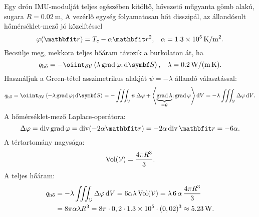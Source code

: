 \documentclass{szb-solution}
\begin{document}
Egy drón IMU-modulját teljes egészében kitöltő, hővezető műgyanta gömb alakú,
sugara $R = \SI{0.02}{\meter}$, A vezérlő egység folyamatosan hőt disszipál, az
állandósult hő\-mér\-sék\-let-mező jó közelítéssel
$$
  \varphi(\coordv) = T_c - \alpha \rvec r^2
  \text, \quad
  \alpha = \SI[per-mode=symbol]{1,3e5}{\kelvin\per\meter\squared}
  \text.
$$
Becsülje meg, mekkora teljes hőáram távozik a burkolaton át, ha
$$
  q_{\text{hő}}
  = -\oiint_{\partial \volimage} \scalar{\lambda \grad \varphi}{\dd \surfvec}
  \text,\quad
  \lambda = \SI[per-mode=symbol]{0,2}{\watt\per\meter\per\kelvin}
  \text.
$$
Használjuk a Green-tétel asszimetrikus alakját $\psi = -\lambda$ állandó
választással:
$$
  q_\text{hő}
  = \oiint_{\partial \volimage} \scalar{-\lambda \grad \varphi}{\dd \surfvec}
  = - \iiint_{\volimage} \psi \, \Delta \varphi + \scalar{\underbrace{\grad \lambda}_{= \nvec}}{\grad \varphi} \dd \volscalar
  = -\lambda \iiint_{\volimage} \Delta \varphi \dd \volscalar
  \text.
$$
A hőmérséklet-mező Laplace-operátora:
$$
  \Delta \varphi
  = \Div \grad \varphi
  = \Div (-2 \alpha \coordvec)
  = -2 \alpha \Div \coordvec
  = -6 \alpha
  \text.
$$
A tértartomány nagysága:
$$
  \operatorname{Vol}(\volimage)
  = \frac{4\pi R^3}{3}
  \text.
$$
A teljes hőáram:
\begin{align*}
  q_\text{hő}
   & = -\lambda \iiint_{\volimage} \Delta \varphi \dd \volscalar
  = 6 \alpha \lambda \operatorname{Vol}(\volimage)
  = \lambda \, 6 \, \alpha \, \frac{4\pi R^3}{3}
  \\
   & = 8 \pi \alpha \lambda R^3
  = 8 \pi \cdot 0,2 \cdot \SI[per-mode=symbol]{1,3e5}{} \cdot (0,02)^3
  \approx \SI{5.23}{\watt}
  \text.
\end{align*}
\end{document}
